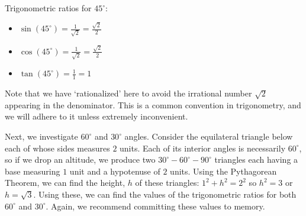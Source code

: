 \documentclass{ximera}
\begin{document}
\begin{image}
\end{image}


Trigonometric ratios for $45^{\circ}$:


\begin{itemize}

\item  $\sin\left(45^{\circ}\right) = \frac{1}{\sqrt{2}} = \frac{\sqrt{2}}{2}$

\item  $\cos\left(45^{\circ}\right) = \frac{1}{\sqrt{2}} =\frac{\sqrt{2}}{2}$


\item  $\tan\left(45^{\circ}\right) = \frac{1}{1} = 1$

\end{itemize}




Note that we have `rationalized' here to avoid the irrational number $\sqrt{2}$ appearing in the denominator.  This is a common convention in trigonometry, and we will adhere to it unless extremely inconvenient.  



Next, we investigate $60^{\circ}$ and $30^{\circ}$ angles.  Consider the equilateral triangle below  each of whose sides measures $2$ units.  Each of its interior angles is necessarily $60^{\circ}$, so if we drop an altitude, we produce two $30^{\circ} - 60^{\circ} - 90^{\circ}$ triangles each having a base measuring $1$ unit and a hypotenuse of $2$ units.  Using the Pythagorean Theorem, we can find the height, $h$ of these triangles: $1^2+h^2 = 2^2$ so $h^2 = 3$ or $h = \sqrt{3}$.  Using these, we can find the values of the trigonometric ratios for both $60^{\circ}$ and $30^{\circ}$.  Again, we recommend committing these values to memory.
\end{document}
